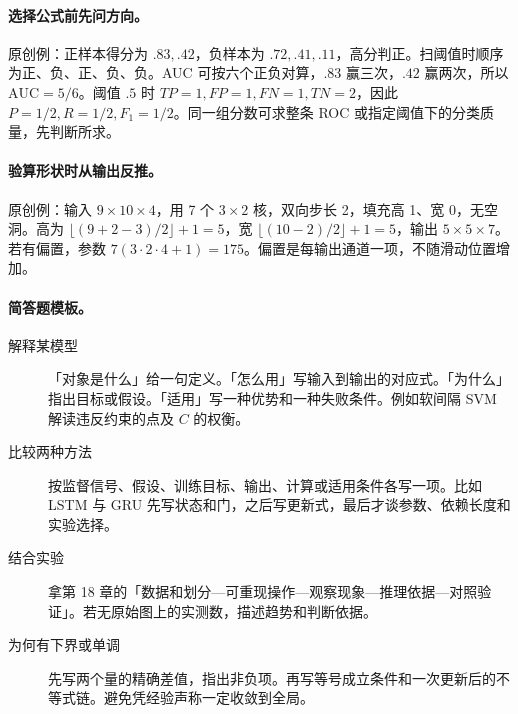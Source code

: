 \documentclass[UTF8,a4paper,zihao=-4,fontset=fandol]{ctexrep}
\begin{document}
\paragraph{选择公式前先问方向。}
原创例：正样本得分为 $.83,.42$，负样本为 $.72,.41,.11$，高分判正。扫阈值时顺序为正、负、正、负、负。AUC 可按六个正负对算，$.83$ 赢三次，$.42$ 赢两次，所以 $\mathrm{AUC}=5/6$。阈值 $.5$ 时 $TP=1,FP=1,FN=1,TN=2$，因此 $P=1/2,R=1/2,F_1=1/2$。同一组分数可求整条 ROC 或指定阈值下的分类质量，先判断所求。

\paragraph{验算形状时从输出反推。}
原创例：输入 $9\times10\times4$，用 7 个 $3\times2$ 核，双向步长 2，填充高 1、宽 0，无空洞。高为 $\lfloor(9+2-3)/2\rfloor+1=5$，宽 $\lfloor(10-2)/2\rfloor+1=5$，输出 $5\times5\times7$。若有偏置，参数 $7(3\cdot2\cdot4+1)=175$。偏置是每输出通道一项，不随滑动位置增加。

\paragraph{简答题模板。}
\begin{description}
\item[解释某模型] 「对象是什么」给一句定义。「怎么用」写输入到输出的对应式。「为什么」指出目标或假设。「适用」写一种优势和一种失败条件。例如软间隔 SVM 解读违反约束的点及 $C$ 的权衡。
\item[比较两种方法] 按监督信号、假设、训练目标、输出、计算或适用条件各写一项。比如 LSTM 与 GRU 先写状态和门，之后写更新式，最后才谈参数、依赖长度和实验选择。
\item[结合实验] 拿第 18 章的「数据和划分—可重现操作—观察现象—推理依据—对照验证」。若无原始图上的实测数，描述趋势和判断依据。
\item[为何有下界或单调] 先写两个量的精确差值，指出非负项。再写等号成立条件和一次更新后的不等式链。避免凭经验声称一定收敛到全局。
\end{description}
\end{document}
